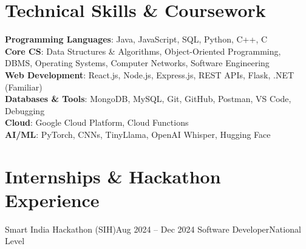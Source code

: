 \resumeSubHeadingListEnd

\section{Technical Skills \& Coursework}

\begin{itemize}[leftmargin=0.15in,label={}]

\small{\item{

\textbf{Programming Languages}{: Java, JavaScript, SQL, Python, C++, C} \\

\textbf{Core CS}{: Data Structures \& Algorithms, Object-Oriented Programming, DBMS, Operating Systems, Computer Networks, Software Engineering} \\

\textbf{Web Development}{: React.js, Node.js, Express.js, REST APIs, Flask, .NET (Familiar)} \\

\textbf{Databases \& Tools}{: MongoDB, MySQL, Git, GitHub, Postman, VS Code, Debugging} \\

\textbf{Cloud}{: Google Cloud Platform, Cloud Functions} \\

\textbf{AI/ML}{: PyTorch, CNNs, TinyLlama, OpenAI Whisper, Hugging Face}

}}

\end{itemize}

\section{Internships \& Hackathon Experience}
\resumeSubHeadingListStart

\resumeSubheading
{Smart India Hackathon (SIH)}{Aug 2024 -- Dec 2024}
{Software Developer}{National Level}

\resumeItemListStart



